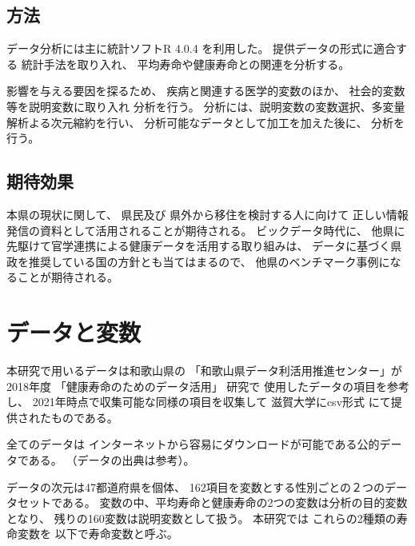 \section{方法}
データ分析には主に統計ソフトR 4.0.4
を利用した。
提供データの形式に適合する
統計手法を取り入れ、
平均寿命や健康寿命との関連を分析する。

影響を与える要因を探るため、
疾病と関連する医学的変数のほか、 社会的変数等を説明変数に取り入れ
分析を行う。
分析には、説明変数の変数選択、多変量解析よる次元縮約を行い、
分析可能なデータとして加工を加えた後に、
分析を行う。




\section{期待効果}

本県の現状に関して、
県民及び
県外から移住を検討する人に向けて
正しい情報発信の資料として活用されることが期待される。
ビックデータ時代に、 他県に先駆けて官学連携による健康データを活用する取り組みは、 データに基づく県政を推奨している国の方針とも当てはまるので、 他県のベンチマーク事例になることが期待される。




\chapter{データと変数}\label{chapter:data}

本研究で用いるデータは和歌山県の
「和歌山県データ利活用推進センター」が
2018年度
「健康寿命のためのデータ活用」
研究で
使用したデータの項目を参考し、
2021年時点で収集可能な同様の項目を収集して
滋賀大学にcsv形式
にて提供されたものである。


全てのデータは
インターネットから容易にダウンロードが可能である公的データである。
（データの出典は参考）。



データの次元は47都道府県を個体、
162項目を変数とする性別ごとの２つのデータセットである。
変数の中、平均寿命と健康寿命の2つの変数は分析の目的変数となり、
残りの160変数は説明変数として扱う。
本研究では
これらの2種類の寿命変数を
以下で寿命変数と呼ぶ。

